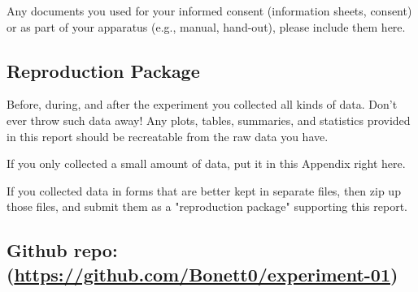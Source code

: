 \documentclass{article}
\begin{document}
Any documents you used for your informed consent (information sheets, consent) or as part of your apparatus (e.g., manual, hand-out), please include them here.

\subsection{Reproduction Package}

Before, during, and after the experiment you collected all kinds of data. Don't ever throw such data away! Any plots, tables, summaries, and statistics provided in this report should be recreatable from the raw data you have.

If you only collected a small amount of data, put it in this Appendix right here.

If you collected data in forms that are better kept in separate files, then zip up those files, and submit them as a "reproduction package" supporting this report.


\subsection*{{Github repo: (\url{https://github.com/Bonett0/experiment-01})}}
\end{document}
